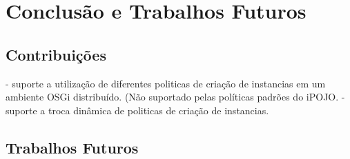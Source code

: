 \chapter{Conclusão e Trabalhos Futuros}
\label{ch:5}

\section{Contribuições}

- suporte a utilização de diferentes politicas de criação de instancias em um ambiente OSGi distribuído. (Não suportado pelas políticas padrões do iPOJO.
- suporte a troca dinâmica de politicas de criação de instancias.


\section{Trabalhos Futuros}
